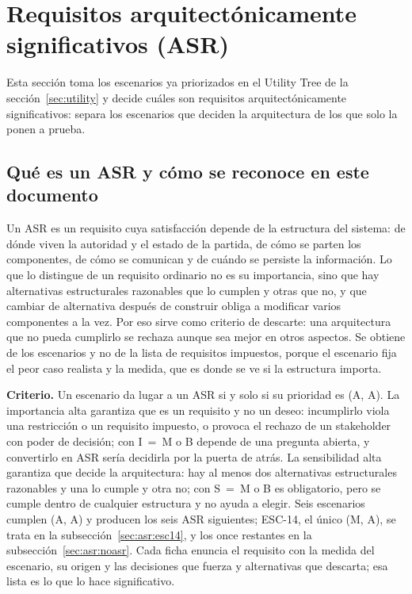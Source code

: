 \section{Requisitos arquitectónicamente significativos (ASR)}\label{sec:asr}

Esta sección toma los escenarios ya priorizados en el Utility Tree de la sección~\ref{sec:utility} y decide cuáles son requisitos arquitectónicamente significativos: separa los escenarios que deciden la arquitectura de los que solo la ponen a prueba.

\subsection{Qué es un ASR y cómo se reconoce en este documento}

Un ASR es un requisito cuya satisfacción depende de la estructura del sistema: de dónde viven la autoridad y el estado de la partida, de cómo se parten los componentes, de cómo se comunican y de cuándo se persiste la información. Lo que lo distingue de un requisito ordinario no es su importancia, sino que hay alternativas estructurales razonables que lo cumplen y otras que no, y que cambiar de alternativa después de construir obliga a modificar varios componentes a la vez. Por eso sirve como criterio de descarte: una arquitectura que no pueda cumplirlo se rechaza aunque sea mejor en otros aspectos. Se obtiene de los escenarios y no de la lista de requisitos impuestos, porque el escenario fija el peor caso realista y la medida, que es donde se ve si la estructura importa.

\textbf{Criterio.} Un escenario da lugar a un ASR si y solo si su prioridad es (A, A). La importancia alta garantiza que es un requisito y no un deseo: incumplirlo viola una restricción o un requisito impuesto, o provoca el rechazo de un stakeholder con poder de decisión; con I~=~M o B depende de una pregunta abierta, y convertirlo en ASR sería decidirla por la puerta de atrás. La sensibilidad alta garantiza que decide la arquitectura: hay al menos dos alternativas estructurales razonables y una lo cumple y otra no; con S~=~M o B es obligatorio, pero se cumple dentro de cualquier estructura y no ayuda a elegir. Seis escenarios cumplen (A, A) y producen los seis ASR siguientes; ESC-14, el único (M, A), se trata en la subsección~\ref{sec:asr:esc14}, y los once restantes en la subsección~\ref{sec:asr:noasr}. Cada ficha enuncia el requisito con la medida del escenario, su origen y las decisiones que fuerza y alternativas que descarta; esa lista es lo que lo hace significativo.

